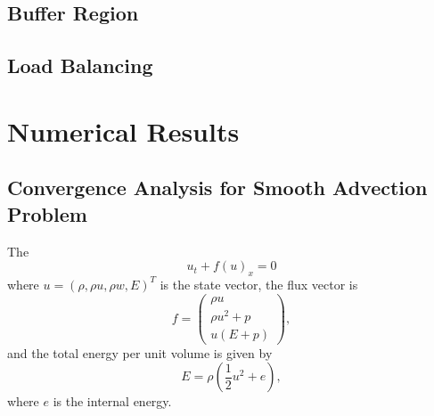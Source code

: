 \documentclass[]{article}
\begin{document}
    \subsection*{Buffer Region}

    \subsection*{Load Balancing}

\section{Numerical Results}

    \subsection*{Convergence Analysis for Smooth Advection Problem}

        The 
        \begin{equation}
           u_{t} + f(u)_{x} = 0
            \label{euler1d}
        \end{equation}
        where $u = \left( \rho, \rho u, \rho w, E \right)^{T}$ is
        the state vector, the flux vector is
        \begin{equation}
            f = 
        \begin{pmatrix}
        \rho u \\ \rho u^2 + p \\ u( E + p )
        \end{pmatrix},
        \end{equation}
        and the total energy per unit volume is given by
        \begin{equation*}
            E = \rho \left( \frac{1}{2} u^2 + e \right),
        \end{equation*}
        where $e$ is the internal energy.
\end{document}
